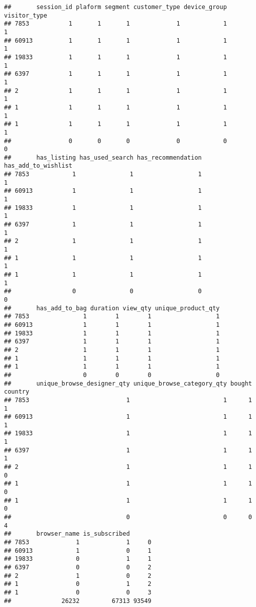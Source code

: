 \documentclass[
]{book}
\begin{document}
\begin{verbatim}
##       session_id plaform segment customer_type device_group visitor_type
## 7853           1       1       1             1            1            1
## 60913          1       1       1             1            1            1
## 19833          1       1       1             1            1            1
## 6397           1       1       1             1            1            1
## 2              1       1       1             1            1            1
## 1              1       1       1             1            1            1
## 1              1       1       1             1            1            1
##                0       0       0             0            0            0
##       has_listing has_used_search has_recommendation has_add_to_wishlist
## 7853            1               1                  1                   1
## 60913           1               1                  1                   1
## 19833           1               1                  1                   1
## 6397            1               1                  1                   1
## 2               1               1                  1                   1
## 1               1               1                  1                   1
## 1               1               1                  1                   1
##                 0               0                  0                   0
##       has_add_to_bag duration view_qty unique_product_qty
## 7853               1        1        1                  1
## 60913              1        1        1                  1
## 19833              1        1        1                  1
## 6397               1        1        1                  1
## 2                  1        1        1                  1
## 1                  1        1        1                  1
## 1                  1        1        1                  1
##                    0        0        0                  0
##       unique_browse_designer_qty unique_browse_category_qty bought country
## 7853                           1                          1      1       1
## 60913                          1                          1      1       1
## 19833                          1                          1      1       1
## 6397                           1                          1      1       1
## 2                              1                          1      1       0
## 1                              1                          1      1       0
## 1                              1                          1      1       0
##                                0                          0      0       4
##       browser_name is_subscribed      
## 7853             1             1     0
## 60913            1             0     1
## 19833            0             1     1
## 6397             0             0     2
## 2                1             0     2
## 1                0             1     2
## 1                0             0     3
##              26232         67313 93549
\end{verbatim}
\end{document}
